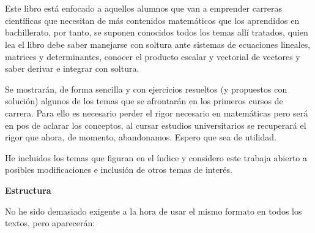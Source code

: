 \chapter*{}

\vspace{-4cm}

\textsf{Este libro está enfocado a aquellos alumnos que van a emprender carreras científicas que necesitan de más contenidos matemáticos que los aprendidos en bachillerato, por tanto, se suponen conocidos todos los temas allí tratados, quien lea el libro debe saber manejarse con soltura ante sistemas de ecuaciones lineales, matrices y determinantes, conocer el producto escalar y vectorial de vectores y saber derivar e integrar con soltura.} 

\textsf{Se mostrarán, de forma sencilla y con ejercicios resueltos (y propuestos con solución) algunos de los temas que se afrontarán en los primeros cursos de carrera. Para ello es necesario perder el rigor necesario en matemáticas pero será en pos de aclarar los conceptos, al cursar estudios universitarios se recuperará el rigor que ahora, de momento, abandonamos. Espero que sea de utilidad.}

\textsf{He incluidos los temas que figuran en el índice y considero este trabaja abierto a posibles modificaciones e inclusión de otros temas de interés.}


\vspace{1cm}

\textbf{Estructura}

No he sido demasiado exigente a la hora de usar el mismo formato en todos los textos, pero aparecerán:

\begin{cuadro-gris}
	
\end{cuadro-gris}

\begin{cuadro-naranja}
	
\end{cuadro-naranja}

\begin{destacado}
	
\end{destacado}

\begin{miejercicio}
	
\end{miejercicio}

\begin{mipropuesto}
	
\end{mipropuesto}

